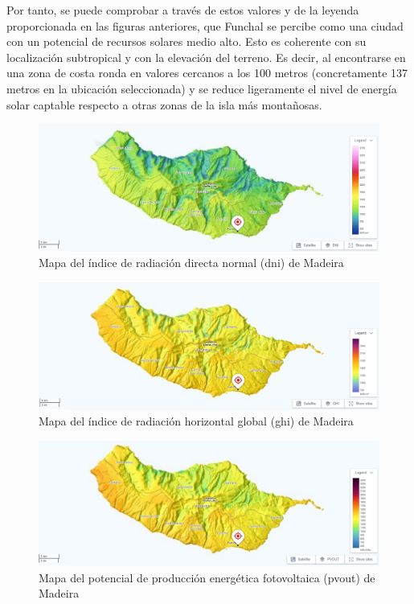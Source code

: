\vspace{3mm}

Por tanto, se puede comprobar a través de estos valores y de la leyenda proporcionada en las figuras anteriores, que Funchal se percibe como una ciudad con un potencial de recursos solares medio alto. Esto es coherente con su localización subtropical y con la elevación del terreno. Es decir, al encontrarse en una zona de costa ronda en valores cercanos a los 100 metros (concretamente 137 metros en la ubicación seleccionada) y se reduce ligeramente el nivel de energía solar captable respecto a otras zonas de la isla más montañosas.

\clearpage

\begin{figure}[H]
    \centering
    \includegraphics[width=1\textwidth]{img/diseno/madeiradni.png}
    \caption{Mapa del índice de radiación directa normal (\acrshort{dni}) de Madeira \cite{globalsolar}}
    \label{fig:madeiradni}
\end{figure}

\begin{figure}[H]
    \centering
    \includegraphics[width=1\textwidth]{img/diseno/madeiraghi.png}
    \caption{Mapa del índice de radiación horizontal global (\acrshort{ghi}) de Madeira \cite{globalsolar}}
    \label{fig:madeiraghi}
\end{figure}

\begin{figure}[H]
    \centering
    \includegraphics[width=1\textwidth]{img/diseno/madeirapvout.png}
    \caption{Mapa del potencial de producción energética fotovoltaica (\acrshort{pvout}) de Madeira \cite{globalsolar}}
    \label{fig:madeirapvout}
\end{figure}

